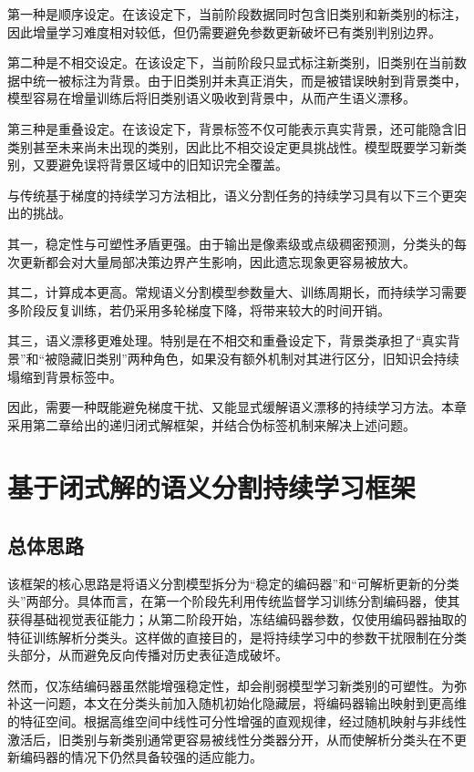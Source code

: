 第一种是顺序设定。在该设定下，当前阶段数据同时包含旧类别和新类别的标注，因此增量学习难度相对较低，但仍需要避免参数更新破坏已有类别判别边界。

第二种是不相交设定。在该设定下，当前阶段只显式标注新类别，旧类别在当前数据中统一被标注为背景。由于旧类别并未真正消失，而是被错误映射到背景类中，模型容易在增量训练后将旧类别语义吸收到背景中，从而产生语义漂移。

第三种是重叠设定。在该设定下，背景标签不仅可能表示真实背景，还可能隐含旧类别甚至未来尚未出现的类别，因此比不相交设定更具挑战性。模型既要学习新类别，又要避免误将背景区域中的旧知识完全覆盖。

与传统基于梯度的持续学习方法相比，语义分割任务的持续学习具有以下三个更突出的挑战。

其一，稳定性与可塑性矛盾更强。由于输出是像素级或点级稠密预测，分类头的每次更新都会对大量局部决策边界产生影响，因此遗忘现象更容易被放大。

其二，计算成本更高。常规语义分割模型参数量大、训练周期长，而持续学习需要多阶段反复训练，若仍采用多轮梯度下降，将带来较大的时间开销。

其三，语义漂移更难处理。特别是在不相交和重叠设定下，背景类承担了“真实背景”和“被隐藏旧类别”两种角色，如果没有额外机制对其进行区分，旧知识会持续塌缩到背景标签中。

因此，需要一种既能避免梯度干扰、又能显式缓解语义漂移的持续学习方法。本章采用第二章给出的递归闭式解框架，并结合伪标签机制来解决上述问题。

\section{基于闭式解的语义分割持续学习框架}

\subsection{总体思路}

该框架的核心思路是将语义分割模型拆分为“稳定的编码器”和“可解析更新的分类头”两部分。具体而言，在第一个阶段先利用传统监督学习训练分割编码器，使其获得基础视觉表征能力；从第二阶段开始，冻结编码器参数，仅使用编码器抽取的特征训练解析分类头。这样做的直接目的，是将持续学习中的参数干扰限制在分类头部分，从而避免反向传播对历史表征造成破坏。

然而，仅冻结编码器虽然能增强稳定性，却会削弱模型学习新类别的可塑性。为弥补这一问题，本文在分类头前加入随机初始化隐藏层，将编码器输出映射到更高维的特征空间。根据高维空间中线性可分性增强的直观规律，经过随机映射与非线性激活后，旧类别与新类别通常更容易被线性分类器分开，从而使解析分类头在不更新编码器的情况下仍然具备较强的适应能力。

